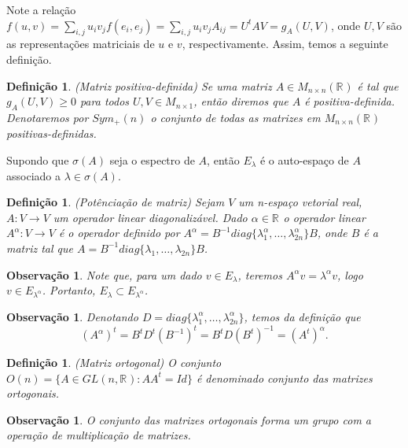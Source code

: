 \documentclass[12pt]{book}
\newtheorem{definicao}[teorema]{Definição}
\newtheorem{observacao}[teorema]{Observação}
\newcommand{\autoespaco}[1]{E_{#1}}
\newcommand{\espectrooperador}[1]{\sigma(#1)}
\newcommand{\generalgroup}[2]{GL(#1, #2)}
\newcommand{\generalgroupreal}[1]{\generalgroup{#1}{\real{}}}
\newcommand{\matrizortogonal}[1]{O(#1)}
\newcommand{\matrizquadreal}[1]{M_{#1 \times #1}(\real{})}
\newcommand{\matrizsimetricapositiva}[1]{Sym_{+}(#1)}
\newcommand{\real}[1]{\mathbb{R}^{#1}}
\begin{document}
	Note a relação $f(u, v) = \sum_{i, j}u_{i}v_{j}f(e_{i}, e_{j}) = \sum_{i, j}u_{i}v_{j}A_{ij} = U^{t}AV = g_{A}(U, V)$, onde $U, V$ são as representações matriciais de $u$ e $v$, respectivamente. Assim, temos a seguinte definição.
	
	\begin{definicao}\label{definicao_matriz_positiva_definida}
		(Matriz positiva-definida) Se uma matriz $A \in \matrizquadreal{n}$ é tal que $g_{A}(U, V)\geq 0$ para todos $U,V \in M_{n\times 1}$, então diremos que $A$ é positiva-definida. Denotaremos por $\matrizsimetricapositiva{n}$ o conjunto de todas as matrizes em $\matrizquadreal{n}$ positivas-definidas.
	\end{definicao}
	
	Supondo que $\espectrooperador{A}$ seja o espectro de $A$, então $\autoespaco{\lambda}$ é o auto-espaço de $A$ associado a $\lambda \in \espectrooperador{A}$.
	
	\begin{definicao}\label{definicao_potenciacao_matriz}
		(Potênciação de matriz) Sejam $V$ um n-espaço vetorial real, $A:V \to V$ um operador linear diagonalizável. Dado $\alpha \in \real{}$ o operador linear $A^{\alpha}:V \to V$ é o operador definido por $A^{\alpha} = B^{-1}diag\{ \lambda_{1}^{\alpha} , \dots, \lambda_{2n}^{\alpha} \}B$, onde $B$ é a matriz tal que $A= B^{-1}diag\{ \lambda_{1}, \dots, \lambda_{2n}\}B$.
	\end{definicao}
	
	\begin{observacao}
		Note que, para um dado $v \in E_{\lambda}$, teremos $A^{\alpha}v = \lambda^{\alpha}v$, logo $v \in E_{\lambda^{\alpha}}$. Portanto, $E_{\lambda}\subset E_{\lambda^{\alpha}}$.
	\end{observacao}
	
	\begin{observacao}\label{observacao_transposta_potenciacao_matriz}
		Denotando $D = diag\{ \lambda_{1}^{\alpha} , \dots, \lambda_{2n}^{\alpha} \}$, temos da definição que
		$$
		(A^{\alpha})^{t} = B^{t}D^{t}(B^{-1})^{t} = B^{t}D(B^{t})^{-1} = (A^{t})^{\alpha}.
		$$
	\end{observacao}
	
	\begin{definicao}
		(Matriz ortogonal) O conjunto $\matrizortogonal{n} =\{ A \in \generalgroupreal{n}: AA^{t}=Id \}$ é denominado conjunto das matrizes ortogonais.
	\end{definicao}
	
	\begin{observacao}
		O conjunto das matrizes ortogonais forma um grupo com a operação de multiplicação de matrizes.
	\end{observacao}
	
\end{document}
